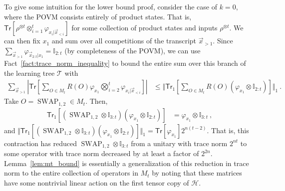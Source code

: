 \documentclass[11pt]{article}
\newcommand{\id}{\ensuremath{\mathbb{I}}}
\newcommand{\Tr}{\mathsf{Tr}}
\newcommand{\SWAP}{\operatorname{SWAP}}
\newcommand{\Hc}{\mathcal{H}}
\begin{document}
To give some intuition for the lower bound proof, consider the case of $k=0$, where the POVM consists entirely of product states. That is, $\Tr[\rho^{\otimes t} \otimes_{i=1}^t \varphi_{x_i\vert \vec{x}_{<i}}]$ for some collection of product states and inputs $\rho^{\otimes t}$. We can then fix $x_1$ and sum over all competitions of the transcript $\vec{x}_{>1}$. Since $\sum_{\vec{x}_{>1}}\varphi_{\vec{x}_{2:t}\vert x_1} =\id_{2:t}$ (by completeness of the POVM), we can use Fact~\ref{fact:trace_norm_inequality} to bound the entire sum over this branch of the learning tree $\mathcal{T}$ with
\begin{align}
    \sum_{\vec{x}_{>1}} \left\vert \Tr\left[\sum_{O \in M_t} R(O) \varphi_{x_1}\bigotimes_{i=2}^t \varphi_{x_i \vert \vec{x}_{<i}}  \right] \right\vert & \leq \Vert \Tr_1\left[ \sum_{O \in M_t} R(O)(\varphi_{x_1} \otimes \id_{2:t}) \right]\Vert_1\ .
\end{align}
Take $O = \SWAP_{1,2} \in M_t$. Then,
\begin{align}
    \Tr_1[(\SWAP_{1,2}\otimes \id_{3:t}) (\varphi_{x_1} \otimes \id_{2:t})] & = \varphi_{x_1} \otimes \id_{3:t}\ ,
\end{align}
and $\Vert \Tr_1[(\SWAP_{1,2}\otimes \id_{3:t}) (\varphi_{x_1} \otimes \id_{2:t})] \Vert_1 = \Tr[\varphi_{x_1}]2^{n(t-2)}$. That is, this contraction has reduced $\SWAP_{1,2}\otimes \id_{3:t}$ from a unitary with trace norm $2^{nt}$ to some operator with trace norm decreased by at least a factor of $2^{2n}$. Lemma~\ref{lem:mt_bound} is essentially a generalization of this reduction in trace norm to the entire collection of operators in $M_t$ by noting that these matrices have some nontrivial linear action on the first tensor copy of $\Hc$.
\end{document}
